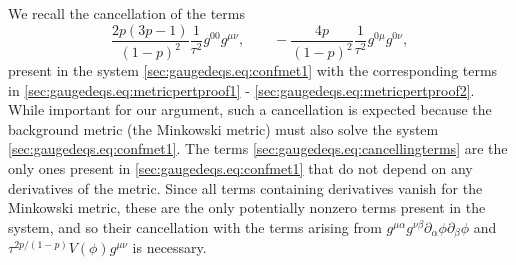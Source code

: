 \documentclass{article}
\newcommand{\pa}{\partial}
\begin{document}
\begin{remark}
We recall the cancellation of the terms
    \begin{equation}\label{sec:gaugedeqs.eq:cancellingterms}
        \frac{2p(3p-1)}{(1-p)^2}\frac{1}{\tau^2}g^{00}g^{\mu\nu} ,\qquad-\frac{4p}{(1-p)^2}\frac{1}{\tau^2}g^{0\mu}g^{0\nu},
    \end{equation}
    present in the system \eqref{sec:gaugedeqs.eq:confmet1} with the corresponding terms in \eqref{sec:gaugedeqs.eq:metricpertproof1} - \eqref{sec:gaugedeqs.eq:metricpertproof2}. While important for our argument, such a cancellation is expected because the background metric (the Minkowski metric) must also solve the system \eqref{sec:gaugedeqs.eq:confmet1}. The terms \eqref{sec:gaugedeqs.eq:cancellingterms} are the only ones present in \eqref{sec:gaugedeqs.eq:confmet1} that do not depend on any derivatives of the metric. Since all terms containing derivatives vanish for the Minkowski metric, these are the only potentially nonzero terms present in the system, and so their cancellation with the terms arising from $g^{\mu\alpha}g^{\nu\beta}\pa_\alpha \phi \pa_\beta \phi$ and $\tau^{2p/(1-p)}V(\phi) g^{\mu\nu}$ is necessary.
\end{remark}
\end{document}
